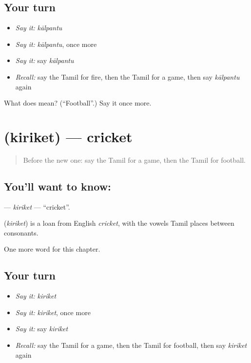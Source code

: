 \subsection*{Your turn}
\begin{itemize}
\raggedright
  \item \emph{Say it:} \emph{kālpantu}
  \item \emph{Say it:} \emph{kālpantu}, once more
  \item \emph{Say it:} say \emph{kālpantu}
  \item \emph{Recall:} say the Tamil for fire, then the Tamil for a game, then say \emph{kālpantu} again
\end{itemize}

\begin{tcolorbox}[breakable,colback=teal!4,colframe=teal!35!black,title={Before you move on}]
What does  mean? (\textquotedblleft{}Football\textquotedblright{}.) Say it once more.
\end{tcolorbox}
\section[\texorpdfstring{\ta{கிரிக்கெட்} (kiriket)}{கிரிக்கெட் (kiriket)}]{ (kiriket) — cricket}

\label{lesson:TA-C249-kiriket}



\begin{quote}
Before the new one: say the Tamil for a game, then the Tamil for football.
\end{quote}

\subsection*{You'll want to know: }
\textbf{} — \emph{kiriket} — \textquotedblleft{}cricket\textquotedblright{}.

\begin{cousinweb}
\textbf{} (\emph{kiriket}) is a loan from English \emph{cricket}, with the vowels Tamil places between consonants.
\end{cousinweb}

\begin{grammarlens}[title={What you've built}]
One more word for this chapter.
\end{grammarlens}

\subsection*{Your turn}
\begin{itemize}
\raggedright
  \item \emph{Say it:} \emph{kiriket}
  \item \emph{Say it:} \emph{kiriket}, once more
  \item \emph{Say it:} say \emph{kiriket}
  \item \emph{Recall:} say the Tamil for a game, then the Tamil for football, then say \emph{kiriket} again
\end{itemize}

